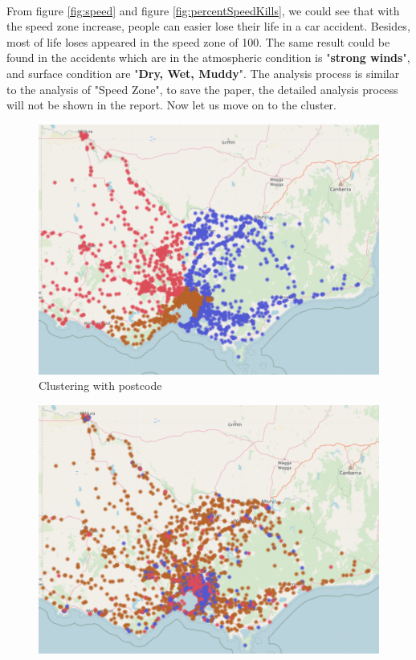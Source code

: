 \documentclass[10pt]{article}
\theoremstyle{definition}
\begin{document}
\vspace{12pt}\\
From figure \ref{fig:speed} and figure \ref{fig:percentSpeedKills}, we could see that with the speed zone increase,  people can easier lose their life in a car accident. Besides, most of life loses appeared in the speed zone of 100. The same result could be found in the accidents which are in the atmospheric condition is "\textbf{strong winds}", and surface condition are "\textbf{Dry, Wet, Muddy}". The analysis process is similar to the analysis of "Speed Zone", to save the paper, the detailed analysis process will not be shown in the report. Now let us move on to the cluster. \par

\begin{minipage}{\linewidth}
  	\centering
  \begin{minipage}{0.49\linewidth}
	\begin{figure}[H]
		\includegraphics[width=\linewidth]{images/cluster3.png}
		\caption{Clustering with postcode}
		\label{fig:clusterWithPostcode}
    \end{figure}
  \end{minipage}
  \hspace{0.0\linewidth}
  \begin{minipage}{0.49\linewidth}
     \begin{figure}[H]
            \includegraphics[width=\linewidth]{images/cluster3_NoPostcode.png}

\end{figure}
\end{minipage}
\end{minipage}
\end{document}
